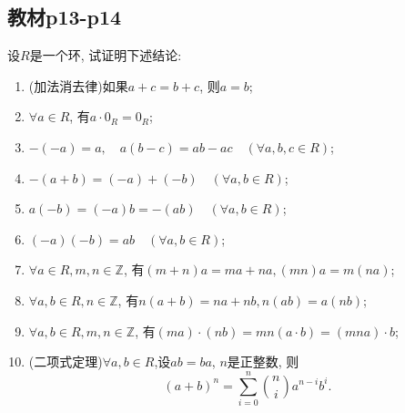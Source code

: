 \subsection{教材p13-p14}

\begin{problem}\label{ex:1.2.1}
    设$R$是一个环, 试证明下述结论:
    \begin{enumerate}[(1)]
        \item (加法消去律)\quad 如果$a + c = b + c$, 则$a = b$;
        \item $\forall a \in R$, 有$a \cdot 0_R = 0_R$;
        \item $-(-a) = a,\quad a(b - c) = ab - ac \quad (\forall a, b, c \in R)$;
        \item $-(a + b) = (-a) + (-b) \quad (\forall a, b \in R)$;
        \item $a(-b) = (-a)b = -(ab) \quad (\forall a, b \in R)$;
        \item $(-a)(-b) = ab \quad (\forall a, b \in R)$;
        \item $\forall a \in R, m, n \in \mathbb{Z}$, 有$(m + n)a = ma + na, (mn)a = m(na)$;
        \item $\forall a, b \in R, n \in \mathbb{Z}$, 有$n(a + b) = na + nb, n(ab) = a(nb)$;
        \item $\forall a, b \in R, m, n \in \mathbb{Z}$, 有$(ma) \cdot (nb) = mn(a \cdot b) = (mna) \cdot b$;
        \item (二项式定理)\quad $\forall a, b \in R$,设$ab = ba$, $n$是正整数, 则
        \[
            (a + b)^n = \sum_{i = 0}^n \binom{n}{i} a^{n - i}b^i.
        \]
    \end{enumerate}
\end{problem}

